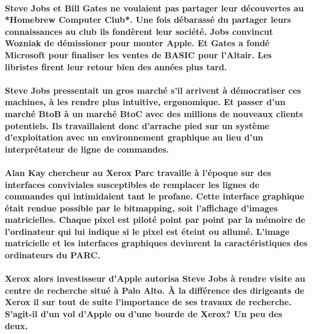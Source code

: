 \paragraph{
  Steve Jobs et Bill Gates ne voulaient pas partager leur découvertes au *Homebrew Computer Club*. Une fois débarassé du partager leurs connaissances au club ils fondèrent leur société. Jobs convincut Wozniak de démissioner pour monter Apple. Et Gates a fondé Microsoft pour finaliser les ventes de BASIC pour l'Altair. Les libristes firent leur retour bien des années plus tard.
}

\paragraph{
  Steve Jobs pressentait un gros marché s'il arrivent à démocratiser ces machines, à les rendre plus intuitive, ergonomique. Et passer d'un marché BtoB à un marché BtoC avec des millions de nouveaux clients potentiels. Ils travaillaient donc d'arrache pied sur un système d'exploitation avec un environnement graphique au lieu d'un interprétateur de ligne de commandes.
}

\paragraph{
  Alan Kay chercheur au Xerox Parc travaille à l'époque sur des interfaces conviviales susceptibles de remplacer les lignes de commandes qui intimidaient tant le profane. Cette interface graphique était rendue possible par le bitmapping, soit l'affichage d'images matricielles. Chaque pixel est piloté point par point par la mémoire de l'ordinateur qui lui indique si le pixel est éteint ou allumé. L'image matricielle et les interfaces graphiques devinrent la caractéristiques des ordinateurs du PARC.
}

\paragraph{
  Xerox alors investisseur d'Apple autorisa Steve Jobs à rendre visite au centre de recherche situé à Palo Alto. À la différence des dirigeants de Xerox il sur tout de suite l'importance de ses travaux de recherche. S'agit-il d'un vol d'Apple ou d'une bourde de Xerox? Un peu des deux.
}

